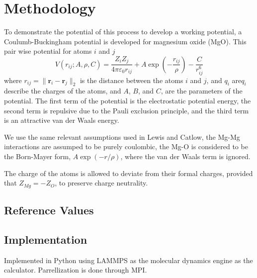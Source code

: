 \section{Methodology}
To demonstrate the potential of this process to develop a working potential, a Coulumb-Buckingham potential\cite{buckingham1938} is developed for magnesium oxide (MgO).  This pair wise potential for atoms $i$ and $j$
\begin{equation}
    \label{eq:buck_eq}
    V(r_{ij};A,\rho,C)
        = \frac{Z_i Z_j}{4 \pi \varepsilon_0 r_{ij}}
            + A \exp(-\frac{r_{ij}}{\rho})
            - \frac{C}{r_{ij}^6}
\end{equation}
where $r_{ij} = \lVert \bm{r}_i - \bm{r}_j \rVert_2$ is the distance between the atoms $i$ and $j$, and $q_i$ are$q_i$ describe the charges of the atoms, and $A$, $B$, and $C$, are the parameters of the potential.  The first term of the potential is the electrostatic potential energy, the second term is repulsive due to the Pauli exclusion principle, and the third term is an attractive van der Waals energy.

We use the same relevant assumptions used in Lewis and Catlow\cite{lewis1985potential}, the Mg-Mg interactions are assumped to be purely coulombic, the Mg-O is considered to be the Born-Mayer form, $A \exp(-r/\rho)$, where the van der Waals term is ignored.

The charge of the atoms is allowed to deviate from their formal charges, provided that $Z_{Mg} = - Z_{O}$, to preserve charge neutrality.
\subsection{Reference Values}

\subsection{Implementation}
Implemented in Python using LAMMPS as the molecular dynamics engine as the calculator.  Parrellization is done through MPI.
